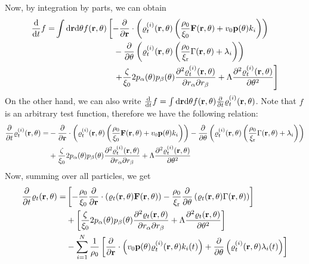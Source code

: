 \documentclass[a5paper]{article}
\begin{document}
Now, by integration by parts, we can obtain
\begin{align}
    \frac{\mathrm{d}}{\mathrm{d} t} f =& \int \mathrm{d}\mathbf{r} \mathrm{d}\theta f( \mathbf{r}, \theta) \left[-
    \frac{\partial }{\partial \mathbf{r}} \cdot\left( \varrho^{(i)}_t(\mathbf{r}, \theta) \left(\frac{\rho_0}{\xi_0}\mathbf{F}(\mathbf{r}, \theta) + v_0 \mathbf{p}(\theta) k_i\right) \right)
    \right.
    \\
    &\qquad\qquad\qquad\quad
    -\frac{\partial }{\partial \theta} \left( \varrho^{(i)}_t(\mathbf{r}, \theta) \left(\frac{\rho_0}{\xi_{\rm r}}\Gamma(\mathbf{r}, \theta) + \lambda_i\right) \right)
    \\
    &\qquad\qquad\qquad\quad\left.
        + \frac{\zeta}{\xi_0} 2 p_\alpha(\theta) p_\beta(\theta) \frac{\partial^2 \varrho^{(i)}_t(\mathbf{r}, \theta)}{\partial r_{\alpha}\partial r_{\beta}} 
    + \Lambda \frac{\partial^2 \varrho^{(i)}_t(\mathbf{r}, \theta)}{\partial \theta^2}
    \right]
\end{align}
On the other hand, we can also write $\frac{\mathrm{d}}{\mathrm{d} t} f = \int \mathrm{d}\mathbf{r} \mathrm{d}\theta f(\mathbf{r}, \theta)\frac{\partial }{\partial t}\varrho^{(i)}_t(\mathbf{r}, \theta) $. Note that $f$ is an arbitrary test function, therefore we have the following relation:
\begin{align}
    \frac{\partial }{\partial t}\varrho^{(i)}_t(\mathbf{r}, \theta) =& -
    \frac{\partial }{\partial \mathbf{r}}\cdot \left( \varrho^{(i)}_t(\mathbf{r}, \theta) \left(\frac{\rho_0}{\xi_0}\mathbf{F}(\mathbf{r}, \theta) + v_0 \mathbf{p}(\theta) k_i\right) \right)
    -
    \frac{\partial }{\partial \theta} \left( \varrho^{(i)}_t(\mathbf{r}, \theta) \left(\frac{\rho_0}{\xi_{\rm r}}\Gamma(\mathbf{r}, \theta) + \lambda_i\right) \right)
    \\
    &+ \frac{\zeta}{\xi_0} 2 p_\alpha(\theta) p_\beta(\theta) \frac{\partial^2 \varrho^{(i)}_t(\mathbf{r}, \theta)}{\partial r_{\alpha}\partial r_{\beta}} 
    + \Lambda \frac{\partial^2 \varrho^{(i)}_t(\mathbf{r}, \theta)}{\partial \theta^2}
\end{align}
Now, summing over all particles, we get
\begin{align}
    \frac{\partial }{\partial t}\varrho_t(\mathbf{r}, \theta) =& 
    \left[-\frac{\rho_0}{\xi_0}\frac{\partial }{\partial \mathbf{r}}\cdot\left(\varrho_t(\mathbf{r}, \theta)\mathbf{F}(\mathbf{r}, \theta)\right)
    -
    \frac{\rho_0}{\xi_{\rm r}}\frac{\partial }{\partial \theta} \left(\varrho_t(\mathbf{r}, \theta)\Gamma(\mathbf{r}, \theta)\right)
    \right]
    \\
    &+
    \left[\frac{\zeta}{\xi_0} 2 p_\alpha(\theta) p_\beta(\theta) \frac{\partial^2 \varrho_t(\mathbf{r}, \theta)}{\partial r_{\alpha}\partial r_{\beta}} 
    + \Lambda \frac{\partial^2 \varrho_t(\mathbf{r}, \theta)}{\partial \theta^2}
    \right]
    \\
    &-
    \sum_{i=1}^N\frac{1}{\rho_0}\left[
     \frac{\partial }{\partial \mathbf{r}}\cdot\left( v_0 \mathbf{p}(\theta) \varrho^{(i)}_t(\mathbf{r}, \theta) k_i(t)\right) +  \frac{\partial }{\partial \theta}\left( \varrho^{(i)}_t(\mathbf{r}, \theta)\lambda_i(t) \right)
    \right]
\end{align}
\end{document}
